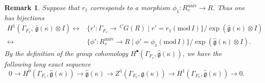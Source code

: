 \documentclass[12pt,oneside,reqno]{amsart}
\theoremstyle{plain}
\newtheorem{remark}[theorem]{Remark}
\begin{document}
\begin{remark}
		
		Suppose that $r_1$ corresponds to a morphism
		$\phi_1
		\colon
		R^\mathrm{univ}_v
		\rightarrow
		R$.
		Thus one has bijections
		\begin{align*}
			H^1(\Gamma_{F_v},\,
			\widehat{\mathfrak{g}}(\kappa)\otimes I)
			\leftrightarrow
			&
			\{
			r'\colon
			\Gamma_{F_v}
			\rightarrow
			\,
			^CG(R)\mid 
			r'=r_1(\mathrm{mod}\,I)
			\}/
			\exp(\widehat{\mathfrak{g}}(\kappa)\otimes I)
			\\
			\leftrightarrow
			&
			\{
			\phi'
			\colon
			R^\mathrm{univ}_v
			\rightarrow
			R\mid 
			\phi'=\phi_1(\mathrm{mod}\,I)
			\}/
			\exp(\widehat{\mathfrak{g}}(\kappa)\otimes I).
		\end{align*}
		By the definition of the group cohomology
		$H^\bullet(\Gamma_{F_v},
		\widehat{\mathfrak{g}}(\kappa))$,
		we have the following long exact sequence
		\begin{equation}\label{isomorphism of general tangent spaces-exact sequence}
			0
			\rightarrow
			H^0(\Gamma_{F_v},\widehat{\mathfrak{g}}(\kappa))
			\rightarrow
			\widehat{\mathfrak{g}}(\kappa)
			\rightarrow
			Z^1(\Gamma_{F_v},\widehat{\mathfrak{g}}(\kappa))
			\rightarrow
			H^1(\Gamma_{F_v},\widehat{\mathfrak{g}}(\kappa))
			\rightarrow
			0.
		\end{equation}
	\end{remark}
	
	
	
	
	
	
	
\end{document}
